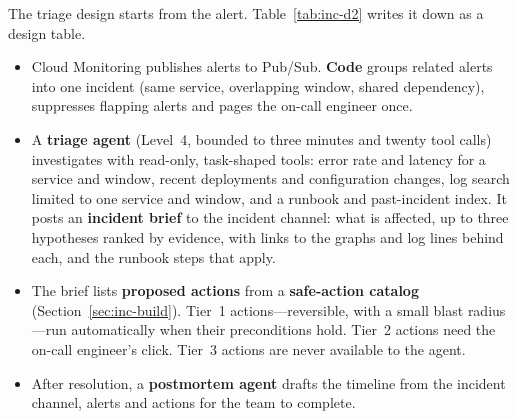 The triage design starts from the alert. Table~\ref{tab:inc-d2} writes it down as a design table.
\begin{itemize}[itemsep=1pt]
  \item Cloud Monitoring publishes alerts to Pub/Sub. \textbf{Code} groups related alerts into one incident (same service, overlapping window, shared dependency), suppresses flapping alerts and pages the on-call engineer once.
  \item A \textbf{triage agent} (Level~4, bounded to three minutes and twenty tool calls) investigates with read-only, task-shaped tools: error rate and latency for a service and window, recent deployments and configuration changes, log search limited to one service and window, and a runbook and past-incident index. It posts an \textbf{incident brief} to the incident channel: what is affected, up to three hypotheses ranked by evidence, with links to the graphs and log lines behind each, and the runbook steps that apply.
  \item The brief lists \textbf{proposed actions} from a \textbf{safe-action catalog} (Section~\ref{sec:inc-build}). Tier~1 actions---reversible, with a small blast radius---run automatically when their preconditions hold. Tier~2 actions need the on-call engineer's click. Tier~3 actions are never available to the agent.
  \item After resolution, a \textbf{postmortem agent} drafts the timeline from the incident channel, alerts and actions for the team to complete.
\end{itemize}

